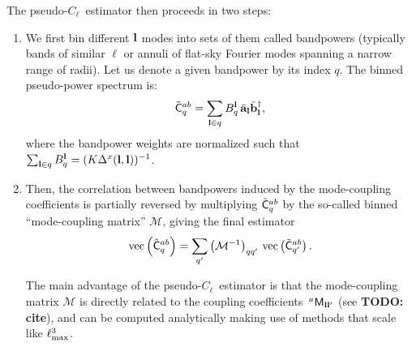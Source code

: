 \documentclass[a4paper,11pt]{article}
\newcommand{\todo}[1]{{\bf TODO: #1}}
\newcommand{\PCL}{pseudo-$C_\ell$~}
\begin{document}
      The \PCL estimator then proceeds in two steps:
      \begin{enumerate}
        \item We first bin different ${\bf l}$ modes into sets of them called bandpowers (typically bands of similar $\ell$ or annuli of flat-sky Fourier modes spanning a narrow range of radii). Let us denote a given bandpower by its index $q$. The binned pseudo-power spectrum is:
        \begin{equation}
          \tilde{\sf C}^{ab}_q=\sum_{{\bf l}\in q} B_q^{\bf l}\,\tilde{\bf a}_{\bf l}\tilde{\bf b}^\dag_{\bf l},
        \end{equation}
        where the bandpower weights are normalized such that $\sum_{{\bf l}\in q}B_q^{\bf l}=(K\Delta^x({\bf l},{\bf l}))^{-1}$.
        \item Then, the correlation between bandpowers induced by the mode-coupling coefficients is partially reversed by multiplying $\tilde{\sf C}^{ab}_q$ by the so-called binned ``mode-coupling matrix'' $\mathcal{M}$, giving the final estimator
        \begin{equation}
          {\rm vec}\left(\hat{\sf C}^{ab}_q\right) = \sum_{q'} \left(\mathcal{M}^{-1}\right)_{qq'}\,{\rm vec}\left(\tilde{\sf C}^{ab}_{q'}\right).
        \end{equation}

        The main advantage of the \PCL estimator is that the mode-coupling matrix $\mathcal{M}$ is directly related to the coupling coefficients $\,^a{\sf M}_{{\bf l}{\bf l}'}$ (see \todo{cite}), and can be computed analytically making use of methods that scale like $\ell_{\rm max}^3$.
      \end{enumerate}
    
\end{document}
